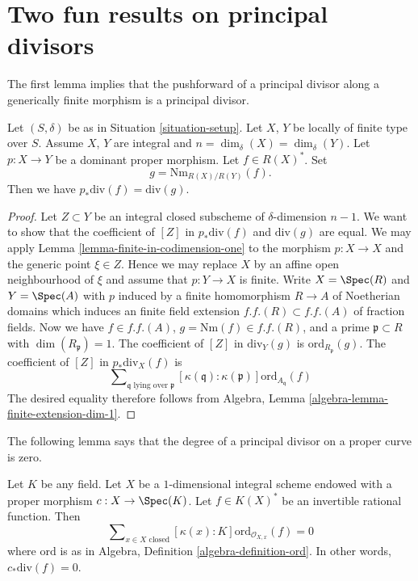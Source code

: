 \section{Two fun results on principal divisors}
\label{section-two-fun}

\noindent
The first lemma implies that the pushforward of a principal
divisor along a generically finite morphism is a principal divisor.

\begin{lemma}
\label{lemma-proper-pushforward-alteration}
Let $(S, \delta)$ be as in Situation \ref{situation-setup}.
Let $X$, $Y$ be locally of finite type over $S$. Assume $X$, $Y$
are integral and $n = \dim_\delta(X) = \dim_\delta(Y)$.
Let $p : X \to Y$ be a dominant proper morphism.
Let $f \in R(X)^*$. Set
$$
g = \text{Nm}_{R(X)/R(Y)}(f).
$$
Then we have
$p_*\text{div}(f) = \text{div}(g)$.
\end{lemma}

\begin{proof}
Let $Z \subset Y$ be an integral closed subscheme of $\delta$-dimension
$n - 1$. We want to show that the coefficient of $[Z]$ in
$p_*\text{div}(f)$ and $\text{div}(g)$ are equal. We may apply
Lemma \ref{lemma-finite-in-codimension-one}
to the morphism $p : X \to X$ and the generic point $\xi \in Z$.
Hence we may replace $X$ by an
affine open neighbourhood of $\xi$ and assume that $p : Y \to X$ is finite.
Write $X = \Spec(R)$ and $Y = \Spec(A)$ with $p$ induced
by a finite homomorphism $R \to A$ of Noetherian domains which induces
an finite field extension $f.f.(R) \subset f.f.(A)$ of fraction fields.
Now we have $f \in f.f.(A)$, $g = \text{Nm}(f) \in f.f.(R)$,
and a prime $\mathfrak p \subset R$ with $\dim(R_{\mathfrak p}) = 1$.
The coefficient of $[Z]$ in $\text{div}_Y(g)$ is
$\text{ord}_{R_\mathfrak p}(g)$.
The coefficient of $[Z]$ in $p_*\text{div}_X(f)$ is
$$
\sum\nolimits_{\mathfrak q\text{ lying over }\mathfrak p}
[\kappa(\mathfrak q) : \kappa(\mathfrak p)]
\text{ord}_{A_{\mathfrak q}}(f)
$$
The desired equality therefore follows from
Algebra, Lemma \ref{algebra-lemma-finite-extension-dim-1}.
\end{proof}

\noindent
The following lemma says that the degree of a principal divisor on
a proper curve is zero.

\begin{lemma}
\label{lemma-curve-principal-divisor}
Let $K$ be any field. Let $X$ be a $1$-dimensional integral scheme
endowed with a proper morphism $c : X \to \Spec(K)$.
Let $f \in K(X)^*$ be an invertible rational function.
Then
$$
\sum\nolimits_{x \in X \text{ closed}}
[\kappa(x) : K] \text{ord}_{\mathcal{O}_{X, x}}(f)
=
0
$$
where $\text{ord}$ is as in
Algebra, Definition \ref{algebra-definition-ord}.
In other words, $c_*\text{div}(f) = 0$.
\end{lemma}

